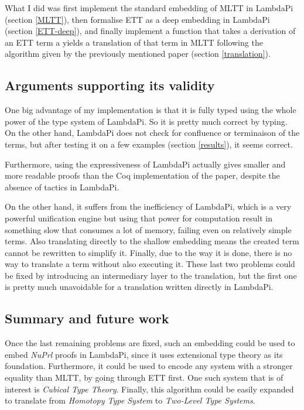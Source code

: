 What I did was first implement the standard embedding of MLTT in LambdaPi
(section \ref{MLTT}), then formalise ETT as a deep embedding in LambdaPi
(section \ref{ETT-deep}), and finally implement a function that takes a
derivation of an ETT term a yields a translation of that term in MLTT following
the algorithm given by the previously mentioned paper (section
\ref{translation}).

\subsection*{Arguments supporting its validity}

One big advantage of my implementation is that it is fully typed using the whole
power of the type system of LambdaPi. So it is pretty much correct by typing. On
the other hand, LambdaPi does not check for confluence or terminaison of the
terms, but after testing it on a few examples (section \ref{results}), it seems
correct.

Furthermore, using the expressiveness of LambdaPi actually gives smaller and
more readable proofs than the Coq implementation of the paper, despite the
absence of tactics in LambdaPi.

On the other hand, it suffers from the inefficiency of LambdaPi, which is a very
powerful unification engine but using that power for computation result in
something slow that consumes a lot of memory, failing even on relatively simple
terms. Also translating directly to the shallow embedding means the created term
cannot be rewritten to simplify it. Finally, due to the way it is done, there is
no way to translate a term without also executing it. These last two problems
could be fixed by introducing an intermediary layer to the translation, but the
first one is pretty much unavoidable for a translation written directly in
LambdaPi.

\subsection*{Summary and future work}

Once the last remaining problems are fixed, such an embedding could be used to
embed \emph{NuPrl} proofs in LambdaPi, since it uses extensional type theory as
its foundation.  Furthermore, it could be used to encode any system with a
stronger equality than MLTT, by going through ETT first. One such system that is
of interest is \emph{Cubical Type Theory}.  Finally, this algorithm could be
easily expanded to translate from \emph{Homotopy Type
System}\cite{voevodsky_simple_2013} to \emph{Two-Level Type
Systems}\cite{annenkov_two-level_2019}.
